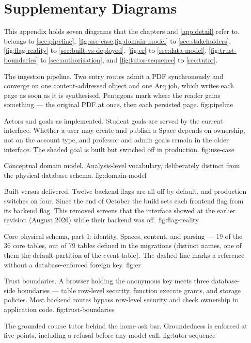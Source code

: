 \chapter{Supplementary Diagrams}
\label{app:figures}

This appendix holds seven diagrams that the chapters and \cref{app:detail}
refer to.  belongs to \cref{sec:pipeline},
\cref{fig:use-case,fig:domain-model} to \cref{sec:stakeholders},
\cref{fig:flag-reality} to \cref{sec:built-vs-deployed},
\cref{fig:er} to \cref{sec:data-model},
\cref{fig:trust-boundaries} to \cref{sec:authorisation}, and
\cref{fig:tutor-sequence} to \cref{sec:tutor}.

  {The ingestion pipeline. Two entry routes admit a PDF synchronously and
   converge on one content-addressed object and one Arq job, which writes each
   page as soon as it is synthesised. Pentagons mark where the reader gains
   something --- the original PDF at once, then each persisted page.}
  {fig:pipeline}

  {Actors and goals as implemented. Student goals are served by the current
   interface. Whether a user may create and publish a Space depends on
   ownership, not on the account type, and professor and admin goals remain in
   the older interface. The shaded goal is built but
   switched off in production.}
  {fig:use-case}

  {Conceptual domain model. Analysis-level vocabulary, deliberately distinct
   from the physical database schema.}
  {fig:domain-model}

  {Built versus delivered. Twelve backend flags are all off by default, and
   production switches on four. Since the end of October the build sets each frontend flag from its backend flag. This removed screens that the interface showed at the earlier revision \thesisEarlierCommit{} (August 2026) while their backend was off.}
  {fig:flag-reality}

  {Core physical schema, part 1: identity, Spaces, content, and parsing --- 19
   of the 36 core tables, out of 79 tables defined in the migrations
   (distinct  names, one of them the default partition of
   the event table). The dashed line marks a reference without a database-enforced foreign
   key.}
  {fig:er}

  {Trust boundaries. A browser holding the anonymous key meets three
   database-side boundaries --- table row-level security, function execute grants, and storage policies. Most backend routes bypass row-level security
   and check ownership in application code.}
  {fig:trust-boundaries}

  {The grounded course tutor behind the home ask bar. Groundedness is enforced
   at five points, including a refusal before any model call.}
  {fig:tutor-sequence}
